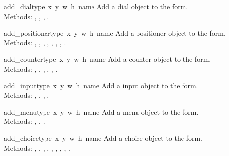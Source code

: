 \begin{flushleft}
\begin{funcdesc}{add_dial}{type\, x\, y\, w\, h\, name}
Add a dial object to the form. \\
Methods:
,
,
,
.
\end{funcdesc}

\begin{funcdesc}{add_positioner}{type\, x\, y\, w\, h\, name}
Add a positioner object to the form. \\
Methods:
,
,
,
,
,
,
,
.
\end{funcdesc}

\begin{funcdesc}{add_counter}{type\, x\, y\, w\, h\, name}
Add a counter object to the form. \\
Methods:
,
,
,
,
,
.
\end{funcdesc}


\begin{funcdesc}{add_input}{type\, x\, y\, w\, h\, name}
Add a input object to the form. \\
Methods:
,
,
,
.
\end{funcdesc}


\begin{funcdesc}{add_menu}{type\, x\, y\, w\, h\, name}
Add a menu object to the form. \\
Methods:
,
,
.
\end{funcdesc}

\begin{funcdesc}{add_choice}{type\, x\, y\, w\, h\, name}
Add a choice object to the form. \\
Methods:
,
,
,
,
,
,
,
,
.
\end{funcdesc}


\end{flushleft}
